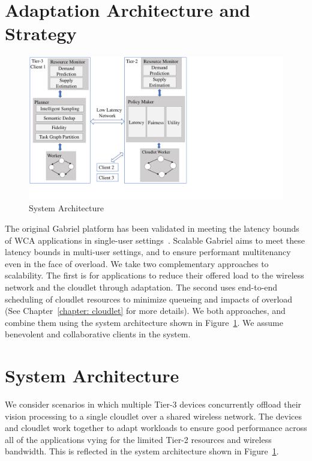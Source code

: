 \section{Adaptation Architecture and Strategy}

\begin{figure}[h]
\centering
\includegraphics[width=\textwidth,trim=0 3em 11cm 0, clip]{FIGS/arch-vertical.pdf}
\vspace{-0.3in}
\caption{\small System Architecture}
\label{fig:arch}
\end{figure}

The original Gabriel platform has been validated in meeting the latency bounds
of WCA applications in single-user settings~\cite{chen2017empirical}.  Scalable
Gabriel aims to meet these latency bounds in multi-user settings, and to ensure
performant multitenancy even in the face of overload.  We take two complementary
approaches to scalability.  The first is for applications to reduce their
offered load to the wireless network and the cloudlet through adaptation.  The
second uses end-to-end scheduling of cloudlet resources to minimize queueing and
impacts of overload (See Chapter~\ref{chapter: cloudlet} for more details).  We
both approaches, and combine them using the system architecture shown in
Figure~\ref{fig:arch}.  We assume benevolent and collaborative clients in the
system.

\section{System Architecture}

We consider scenarios in which multiple Tier-3 devices concurrently
offload their vision processing to a single cloudlet over a shared
wireless network.  The devices and cloudlet work together to adapt
workloads to ensure good performance across all of the applications
vying for the limited Tier-2 resources and wireless bandwidth.  This
is reflected in the system architecture shown in
Figure~\ref{fig:arch}.

